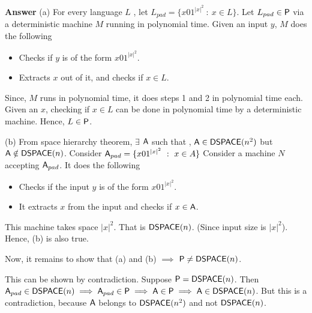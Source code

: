 \documentclass[addpoints,12pt]{exam}
\begin{document}
\begin{questions}

\textbf{Answer} \newline
(a) For every language $L$ , let $L_{pad} = \{x01^{|x|^2}~:~x \in L\}$. \newline
Let $L_{pad} \in \P$ via a deterministic machine $M$ running in polynomial time. \newline
Given an input $y$, $M$ does the following
\begin{itemize}
 \item Checks if $y$ is of the form $x01^{|x|^2}$.
 \item Extracts $x$ out of it, and checks if $x \in L$.
\end{itemize}

Since, $M$ runs in polynomial time, it does steps 1 and 2 in polynomial time each. Given an $x$, checking if $x \in L$ can be done in polynomial time by a deterministic machine.
Hence, $L \in \P$.

(b) From space hierarchy theorem, $\exists$ $\A$ such that , $\A \in \DSPACE(n^2)$ but $\A \notin \DSPACE(n)$. \newline
Consider $\A_{pad} = \{x01^{|x|^2}~:~x \in A\}$ \newline
Consider a machine $N$ accepting $\A_{pad}$. It does the following
\begin{itemize}
 \item Checks if the input $y$ is of the form $x01^{|x|^2}$.
 \item It extracts $x$ from the input and checks if $x \in \A$.
\end{itemize}

This machine takes space $|x|^{2}$. That is $\DSPACE(n)$. (Since input size is $|x|^{2}$).
Hence, (b) is also true.

Now, it remains to show that (a) and (b) $\implies$ $\P \neq \DSPACE(n)$. \newline

This can be shown by contradiction. Suppose $\P = \DSPACE(n)$. Then $\A_{pad} \in \DSPACE(n) \implies \A_{pad} \in \P \implies \A \in \P \implies \A \in \DSPACE(n)$.
\newline
But this is a contradiction, because $\A$ belongs to $\DSPACE(n^{2})$ and not $\DSPACE(n)$.


\end{questions}
\end{document}
